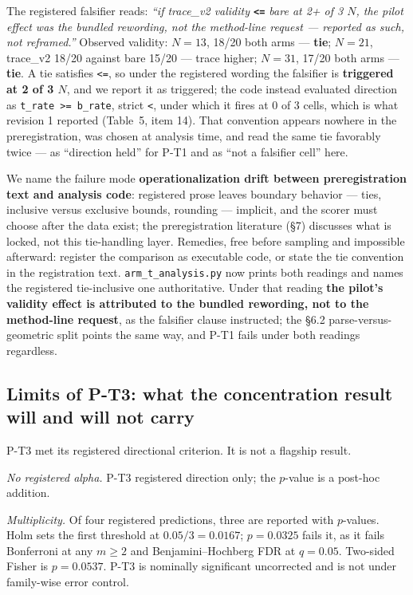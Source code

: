 \documentclass[11pt]{article}
\begin{document}
The registered falsifier reads: \textit{``if trace\_v2 validity \textbf{\texttt{<=}} bare at 2+ of 3 $N$, the pilot effect
was the bundled rewording, not the method-line request --- reported as such, not reframed.''}
Observed validity: $N = 13$, 18/20 both arms --- \textbf{tie}; $N = 21$, trace\_v2 18/20 against bare 15/20 ---
trace higher; $N = 31$, 17/20 both arms --- \textbf{tie}. A tie satisfies \texttt{<=}, so under the registered
wording the falsifier is \textbf{triggered at 2 of 3 $N$}, and we report it as triggered; the code
instead evaluated direction as \texttt{t\_rate >= b\_rate}, strict \texttt{<}, under which it fires at 0 of 3
cells, which is what revision 1 reported (Table~5, item 14). That convention appears nowhere in
the preregistration, was chosen at analysis time, and read the same tie favorably twice --- as
``direction held'' for P-T1 and as ``not a falsifier cell'' here.

We name the failure mode \textbf{operationalization drift between preregistration text and analysis
code}: registered prose leaves boundary behavior --- ties, inclusive versus exclusive bounds,
rounding --- implicit, and the scorer must choose after the data exist; the preregistration
literature (\S7) discusses what is locked, not this tie-handling layer. Remedies, free before
sampling and impossible afterward: register the comparison as executable code, or state the tie
convention in the registration text. \texttt{arm\_t\_analysis.py} now prints both readings and names the
registered tie-inclusive one authoritative. Under that reading \textbf{the pilot's validity effect is
attributed to the bundled rewording, not to the method-line request}, as the falsifier clause
instructed; the \S6.2 parse-versus-geometric split points the same way, and P-T1 fails under both
readings regardless.

\subsection{Limits of P-T3: what the concentration result will and will not carry}

P-T3 met its registered directional criterion. It is not a flagship result.

\textit{No registered alpha.} P-T3 registered direction only; the $p$-value is a post-hoc addition.

\textit{Multiplicity.} Of four registered predictions, three are reported with $p$-values. Holm sets the
first threshold at $0.05/3 = 0.0167$; $p = 0.0325$ fails it, as it fails Bonferroni at any $m \ge 2$ and
Benjamini--Hochberg FDR at $q = 0.05$. Two-sided Fisher is $p = 0.0537$. P-T3 is nominally significant
uncorrected and is not under family-wise error control.
\end{document}
